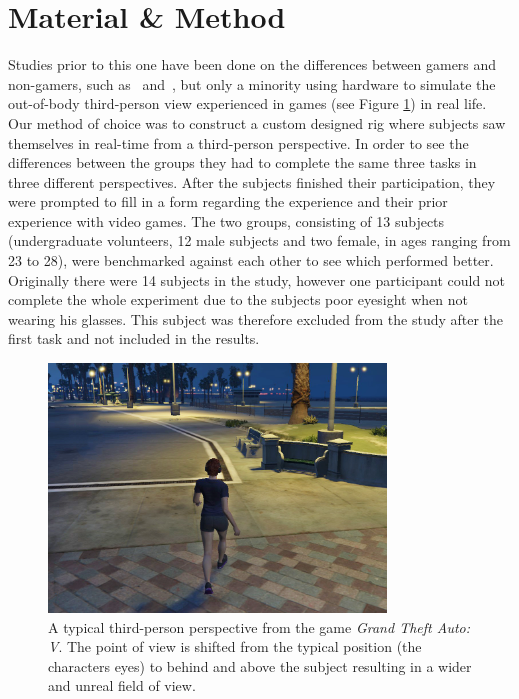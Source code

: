 \documentclass[runningheads,a4paper,oribibl]{llncs}
\begin{document}

\section{Material \& Method}
Studies prior to this one have been done on the differences between gamers and non-gamers, such as~\cite{schmierbach2011exploring} and~\cite{gong2015enhanced}, but only a minority using hardware to simulate the out-of-body third-person view experienced in games (see Figure \ref{fig:GTAIV}) in real life. Our method of choice was to construct a custom designed rig where subjects saw themselves in real-time from a third-person perspective. In order to see the differences between the groups they had to complete the same three tasks in three different perspectives. After the subjects finished their participation, they were prompted to fill in a form regarding the experience and their prior experience with video games. The two groups, consisting of 13 subjects (undergraduate volunteers, 12 male subjects and two female, in ages ranging from 23 to 28), were benchmarked against each other to see which performed better. Originally there were 14 subjects in the study, however one participant could not complete the whole experiment due to the subjects poor eyesight when not wearing his glasses. This subject was therefore excluded from the study after the first task and not included in the results.




\begin{figure}
   \centering
   \includegraphics[width=0.8\textwidth]{ExternalMaterial/GTA}
   \caption{A typical third-person perspective from the game \emph{Grand Theft Auto: V}. The point of view is shifted from the typical position (the characters eyes) to behind and above the subject resulting in a wider and unreal field of view. \label{fig:GTAIV}}
\end{figure}
\end{document}
